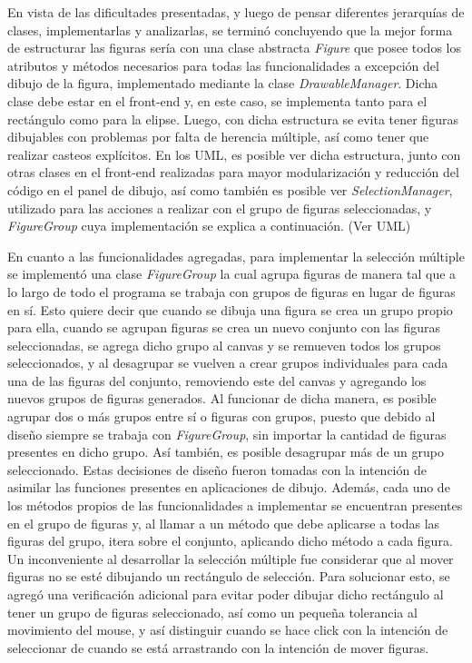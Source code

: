 \documentclass[12pt]{article}
\begin{document}
En vista de las dificultades presentadas, y luego de pensar diferentes jerarquías de clases, implementarlas y analizarlas, se terminó concluyendo que la mejor forma de estructurar las figuras sería con una clase abstracta \textit{Figure} que posee todos los atributos y métodos necesarios para todas las funcionalidades a excepción del dibujo de la figura, implementado mediante la clase \textit{DrawableManager}. Dicha clase debe estar en el front-end y, en este caso, se implementa tanto para el rectángulo como para la elipse. Luego, con dicha estructura se evita tener figuras dibujables con problemas por falta de herencia múltiple, así como tener que realizar casteos explícitos. En los UML, es posible ver dicha estructura, junto con otras clases en el front-end realizadas para mayor modularización y reducción del código en el panel de dibujo, así como también es posible ver \textit{SelectionManager}, utilizado para las acciones a realizar con el grupo de figuras seleccionadas, y \textit{FigureGroup} cuya implementación se explica a continuación. (Ver UML)

En cuanto a las funcionalidades agregadas, para implementar la selección múltiple se implementó una clase \textit{FigureGroup} la cual agrupa figuras de manera tal que a lo largo de todo el programa se trabaja con grupos de figuras en lugar de figuras en sí. Esto quiere decir que cuando se dibuja una figura se crea un grupo propio para ella, cuando se agrupan figuras se crea un nuevo conjunto con las figuras seleccionadas, se agrega dicho grupo al canvas y se remueven todos los grupos seleccionados, y al desagrupar se vuelven a crear grupos individuales para cada una de las figuras del conjunto, removiendo este del canvas y agregando los nuevos grupos de figuras generados. Al funcionar de dicha manera, es posible agrupar dos o más grupos entre sí o figuras con grupos, puesto que debido al diseño siempre se trabaja con \textit{FigureGroup}, sin importar la cantidad de figuras presentes en dicho grupo. Así también, es posible desagrupar más de un grupo seleccionado. Estas decisiones de diseño fueron tomadas con la intención de asimilar las funciones presentes en aplicaciones de dibujo. Además, cada uno de los métodos propios de las funcionalidades a implementar se encuentran presentes en el grupo de figuras y, al llamar a un método que debe aplicarse a todas las figuras del grupo, itera sobre el conjunto, aplicando dicho método a cada figura. Un inconveniente al desarrollar la selección múltiple fue considerar que al mover figuras no se esté dibujando un rectángulo de selección. Para solucionar esto, se agregó una verificación adicional para evitar poder dibujar dicho rectángulo al tener un grupo de figuras seleccionado, así como un pequeña tolerancia al movimiento del mouse, y así distinguir cuando se hace click con la intención de seleccionar de cuando se está arrastrando con la intención de mover figuras.
\end{document}
